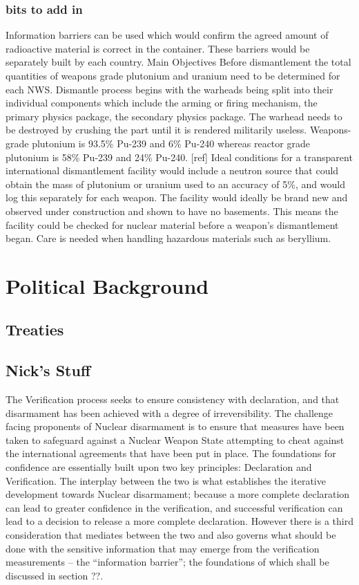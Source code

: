 \documentclass[twocolumn,a4paper]{article}
\begin{document}
\subsubsection{bits to add in}
Information barriers can be used which would confirm the agreed amount
of radioactive material is correct in the container. These barriers
would be separately built by each country.  Main Objectives Before
dismantlement the total quantities of weapons grade plutonium and
uranium need to be determined for each NWS.  Dismantle process begins
with the warheads being split into their individual components which
include the arming or firing mechanism, the primary physics package,
the secondary physics package.  The warhead needs to be destroyed by
crushing the part until it is rendered militarily useless.
Weapons-grade plutonium is 93.5\% Pu-239 and 6\% Pu-240 whereas
reactor grade plutonium is 58\% Pu-239 and 24\% Pu-240. [ref] Ideal
conditions for a transparent international dismantlement facility
would include a neutron source that could obtain the mass of plutonium
or uranium used to an accuracy of 5\%, and would log this separately
for each weapon.  The facility would ideally be brand new and observed
under construction and shown to have no basements. This means the
facility could be checked for nuclear material before a weapon’s
dismantlement began.  Care is needed when handling hazardous materials
such as beryllium.

\section{Political Background}
\subsection{Treaties}

\subsection{Nick's Stuff}
The Verification process seeks to ensure consistency with declaration,
and that disarmament has been achieved with a degree of
irreversibility.  The challenge facing proponents of Nuclear
disarmament is to ensure that measures have been taken to safeguard
against a Nuclear Weapon State attempting to cheat against the
international agreements that have been put in place. The foundations
for confidence are essentially built upon two key principles:
Declaration and Verification. The interplay between the two is what
establishes the iterative development towards Nuclear disarmament;
because a more complete declaration can lead to greater confidence in
the verification, and successful verification can lead to a decision
to release a more complete declaration. However there is a third
consideration that mediates between the two and also governs what
should be done with the sensitive information that may emerge from the
verification measurements -- the ``information barrier''; the
foundations of which shall be discussed in section ??.
\end{document}
